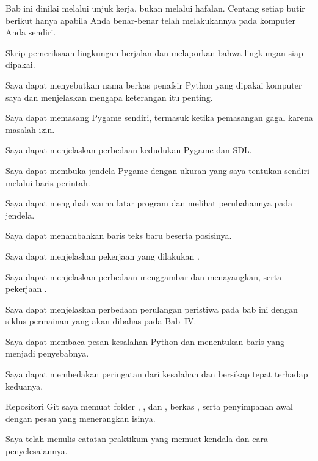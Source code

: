 
Bab ini dinilai melalui unjuk kerja, bukan melalui hafalan. Centang setiap
butir berikut hanya apabila Anda benar-benar telah melakukannya pada komputer
Anda sendiri.

\begin{checklistbox}
\begin{checklist}
  \item Skrip pemeriksaan lingkungan berjalan dan melaporkan bahwa lingkungan
        siap dipakai.
  \item Saya dapat menyebutkan nama berkas penafsir Python yang dipakai
        komputer saya dan menjelaskan mengapa keterangan itu penting.
  \item Saya dapat memasang Pygame sendiri, termasuk ketika pemasangan gagal
        karena masalah izin.
  \item Saya dapat menjelaskan perbedaan kedudukan Pygame dan SDL.
  \item Saya dapat membuka jendela Pygame dengan ukuran yang saya tentukan
        sendiri melalui baris perintah.
  \item Saya dapat mengubah warna latar program dan melihat perubahannya pada
        jendela.
  \item Saya dapat menambahkan baris teks baru beserta posisinya.
  \item Saya dapat menjelaskan pekerjaan yang dilakukan
        .
  \item Saya dapat menjelaskan perbedaan menggambar dan menayangkan, serta
        pekerjaan .
  \item Saya dapat menjelaskan perbedaan perulangan peristiwa pada bab ini
        dengan siklus permainan yang akan dibahas pada Bab~IV.
  \item Saya dapat membaca pesan kesalahan Python dan menentukan baris yang
        menjadi penyebabnya.
  \item Saya dapat membedakan peringatan dari kesalahan dan bersikap tepat
        terhadap keduanya.
  \item Repositori Git saya memuat folder , , dan
        , berkas , serta penyimpanan awal dengan
        pesan yang menerangkan isinya.
  \item Saya telah menulis catatan praktikum yang memuat kendala dan cara
        penyelesaiannya.
\end{checklist}
\end{checklistbox}
